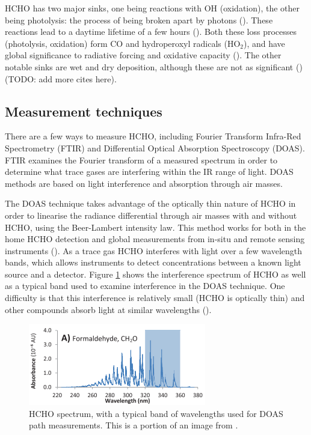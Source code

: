     HCHO has two major sinks, one being reactions with OH (oxidation), the other being photolysis: the process of being broken apart by photons (\cite{Crutzen1999, Wagner2002, Levy1972, Kefauver2014}).
    These reactions lead to a daytime lifetime of a few hours (\cite{Atkinson2000, Millet2006}).
    Both these loss processes (photolysis, oxidation) form CO and hydroperoxyl radicals (HO$_2$), and have global significance to radiative forcing and oxidative capacity (\cite{Franco2015}).
    The other notable sinks are wet and dry deposition, although these are not as significant (\cite{Atkinson2000}) (TODO: add more cites here).
    
  \subsection{Measurement techniques}
  \label{LR:HCHO:Measurements}
    There are a few ways to measure HCHO, including Fourier Transform Infra-Red Spectrometry (FTIR) and Differential Optical Absorption Spectroscopy (DOAS).
    FTIR examines the Fourier transform of a measured spectrum in order to determine what trace gases are interfering within the IR range of light.
    DOAS methods are based on light interference and absorption through air masses.
    
    The DOAS technique takes advantage of the optically thin nature of HCHO in order to linearise the radiance differential through air masses with and without HCHO, using the Beer-Lambert intensity law.
    This method works for both in the home HCHO detection and global measurements from in-situ and remote sensing instruments (\cite{Guenther1995, Abad2015, Davenport2015}).
    As a trace gas HCHO interferes with light over a few wavelength bands, which allows instruments to detect concentrations between a known light source and a detector.
    Figure \ref{LR:HCHO:Measurements:fig_HCHOSpectrum} shows the interference spectrum of HCHO as well as a typical band used to examine interference in the DOAS technique.
    One difficulty is that this interference is relatively small (HCHO is optically thin) and other compounds absorb light at similar wavelengths (\cite{Davenport2015}).
    
    \begin{figure}
      \includegraphics{Figures/HCHO/HCHOAbsorbanceDavenport.png}
      \caption{ %
        HCHO spectrum, with a typical band of wavelengths used for DOAS path measurements.
        This is a portion of an image from \cite{Davenport2015}.}
      \label{LR:HCHO:Measurements:fig_HCHOSpectrum}
    \end{figure}
    
